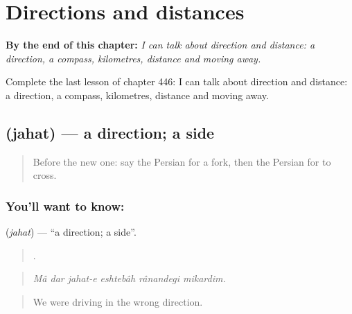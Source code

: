 
\chapter{Directions and distances}
\label{ch:fa-directions-and-distances}

\begin{chapteropening}
\textbf{By the end of this chapter:} \emph{I can talk about direction and distance: a direction, a compass, kilometres, distance and moving away.}

Complete the last lesson of chapter 446: I can talk about direction and distance: a direction, a compass, kilometres, distance and moving away.
\end{chapteropening}

\section[\texorpdfstring{\fa{جهت} (jahat)}{جهت (jahat)}]{ (jahat) — a direction; a side}

\label{lesson:FA-C446-jahat}



\begin{quote}
Before the new one: say the Persian for a fork, then the Persian for to cross.
\end{quote}

\subsection*{You'll want to know: }
\textbf{} (\emph{jahat}) — \textquotedblleft{}a direction; a side\textquotedblright{}.

\begin{quote}
     .
\end{quote}

\begin{quote}
\emph{Mâ dar jahat-e eshtebâh rânandegi mikardim.}
\end{quote}

\begin{quote}
We were driving in the wrong direction.
\end{quote}

